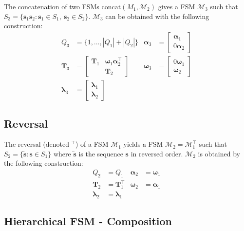 The concatenation of two FSMs $\text{concat}({M}_1, \mathcal{M}_2)$
gives a FSM $\mathcal{M}_3$ such that $S_3 = \{ \mathbf{s}_1 \mathbf{s}_2 :
\mathbf{s}_1 \in S_1, \ \mathbf{s}_2 \in S_2 \}$. $\mathcal{M}_3$
can be obtained with the following construction:
\begin{align}
    Q_3 &= \{1, \dots, |Q_1| + |Q_2| \} &
    \boldsymbol{\alpha}_3 &= \begin{bmatrix}
        \boldsymbol{\alpha}_1 \\
        0 \boldsymbol{\alpha}_2
    \end{bmatrix} \\
    \mathbf{T}_3 &= \begin{bmatrix}
        \mathbf{T}_1 & \boldsymbol{\omega}_1 \boldsymbol{\alpha}_2^\top \\
        & \mathbf{T}_2
    \end{bmatrix} &
    \boldsymbol{\omega}_3 &= \begin{bmatrix}
        0 \boldsymbol{\omega}_1 \\
        \boldsymbol{\omega}_2
    \end{bmatrix} \\
    \boldsymbol{\lambda}_3 &= \begin{bmatrix}
        \boldsymbol{\lambda}_1 \\
        \boldsymbol{\lambda}_2
    \end{bmatrix} & &
\end{align}

\subsection{Reversal}

The reversal (denoted $^\top$) of a FSM $\mathcal{M}_1$ yields a FSM
$\mathcal{M}_2 = \mathcal{M}_1^\top$ such that $S_2 = \{ \overleftarrow{\mathbf{s}} :
\mathbf{s} \in S_1 \}$ where $\overleftarrow{\mathbf{s}}$ is the sequence
$\mathbf{s}$ in reversed order. $\mathcal{M}_2$ is obtained by the
following construction:
\begin{align}
    Q_2 &= Q_1 &
    \boldsymbol{\alpha}_2 &= \boldsymbol{\omega}_1 \\
    \mathbf{T}_2 &= \mathbf{T}_1^\top &
    \boldsymbol{\omega}_2 &= \boldsymbol{\alpha}_1 \\
        \boldsymbol{\lambda}_2 &= \boldsymbol{\lambda}_1 & &
\end{align}

\subsection{Hierarchical FSM - Composition}

